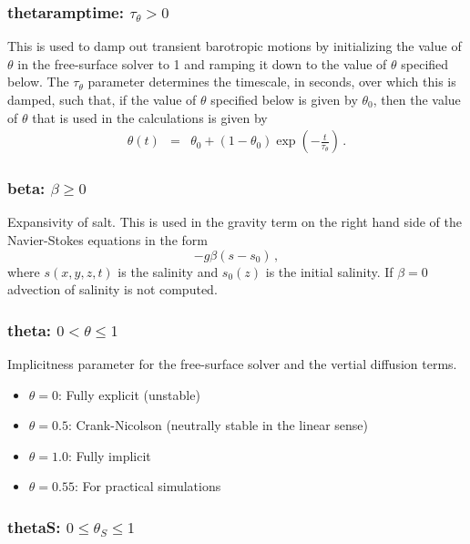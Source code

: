 \subsubsection{thetaramptime: $\tau_\theta >0$}

This is used to damp out transient barotropic motions by initializing
the value of $\theta$ in the free-surface solver to 1 and ramping it
down to the value of $\theta$ specified below.  The $\tau_\theta$ parameter
determines the timescale, in seconds, over which this is damped, such that, if the value
of $\theta$ specified below is given by $\theta_0$, then the value of
$\theta$ that is used in the calculations is given by
\begin{eqnarray}
\theta(t) &=& \theta_0 + (1-\theta_0)\exp\left(-\frac{t}{\tau_\theta}\right)\nonumber\,.
\end{eqnarray}

\subsubsection{beta: $\beta\ge 0$}

Expansivity of salt.  This is used in the gravity term on the right hand side of
the Navier-Stokes equations in the form
\[
-g\beta\left(s-s_0\right)\,,
\]
where $s(x,y,z,t)$ is the salinity and $s_0(z)$ is the initial salinity.  If $\beta=0$
advection of salinity is not computed.  


\subsubsection{theta: $0<\theta\le 1$}

Implicitness parameter for the free-surface solver and the vertial diffusion terms.
\begin{itemize}
\item $\theta=0$: Fully explicit (unstable)
\item $\theta=0.5$: Crank-Nicolson (neutrally stable in the linear sense)
\item $\theta=1.0$: Fully implicit
\item $\theta=0.55$: For practical simulations
\end{itemize}

\subsubsection{thetaS: $0\le \theta_S \le 1$}

